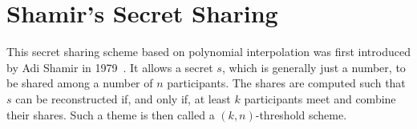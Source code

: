 





\section{Shamir's Secret Sharing}
This secret sharing scheme based on polynomial interpolation was first introduced by Adi Shamir in 1979~\cite{shamir_how_1979}.
It allows a secret $s$, which is generally just a number, to be shared among a number of $n$ participants.
The shares are computed such that $s$ can be reconstructed if, and only if, at least $k$ participants meet and combine their shares.
Such a theme is then called a $(k,n)$-threshold scheme.~\cite{shamir_how_1979}

